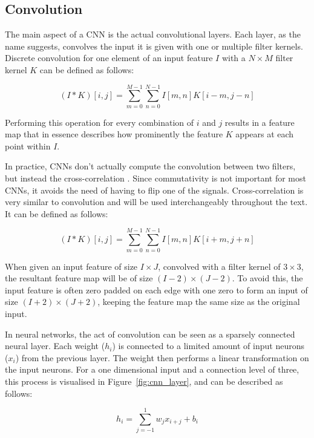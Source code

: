 \subsection{Convolution}

The main aspect of a CNN is the actual convolutional layers. 
Each layer, as the name suggests, convolves the input it is given with one or multiple filter kernels.
Discrete convolution for one element of an input feature $I$ with a $N \times M$ filter kernel $K$ can be defined as follows:

\begin{equation}
    (I \ast K)[i, j] = \displaystyle\sum_{m=0}^{M-1}\displaystyle\sum_{n=0}^{N-1}I[m,n] K[i-m, j-n]
\end{equation}

Performing this operation for every combination of $i$ and $j$ results in a feature map that in essence describes how prominently the feature $K$ appears at each point within $I$.

In practice, CNNs don't actually compute the convolution between two filters, but instead the cross-correlation \cite{murray_2018}. 
Since commutativity is not important for most CNNs, it avoids the need of having to flip one of the signals. 
Cross-correlation is very similar to convolution and will be used interchangeably throughout the text.
It can be defined as follows:

\begin{equation}
    (I \ast K)[i, j] = \displaystyle\sum_{m=0}^{M-1}\displaystyle\sum_{n=0}^{N-1}I[m,n] K[i+m, j+n]
\end{equation}

When given an input feature of size $I \times J$, convolved with a filter kernel of $3\times3$, the resultant feature map will be of size $(I-2)\times(J-2)$.
To avoid this, the input feature is often zero padded on each edge with one zero to form an input of size $(I+2)\times(J+2)$, keeping the feature map the same size as the original input.

In neural networks, the act of convolution can be seen as a sparsely connected neural layer. 
Each weight ($h_i$) is connected to a limited amount of input neurons ($x_i$) from the previous layer.
The weight then performs a linear transformation on the input neurons. 
For a one dimensional input and a connection level of three, this process is visualised in Figure~\ref{fig:cnn_layer}, and can be described as follows:

\begin{equation}
    h_i = \displaystyle\sum_{j=-1}^{1}w_{j}x_{i+j}+b_i
\end{equation}

